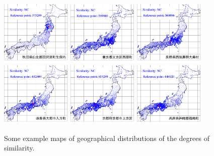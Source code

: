 \documentclass[output=paper]{LSP/langsci}
\begin{document}
\begin{figure}
\includegraphics[width=0.3\textwidth]{illustrations/kuma_fig20-1}
\includegraphics[width=0.3\textwidth]{illustrations/kuma_fig20-2}
\includegraphics[width=0.3\textwidth]{illustrations/kuma_fig20-3}
\\
\includegraphics[width=0.3\textwidth]{illustrations/kuma_fig20-4}
\includegraphics[width=0.3\textwidth]{illustrations/kuma_fig20-5}
\includegraphics[width=0.3\textwidth]{illustrations/kuma_fig20-6}
\caption{Some example maps of geographical distributions of the degrees of similarity.}          
\label{fig:20}
\end{figure}
\end{document}
